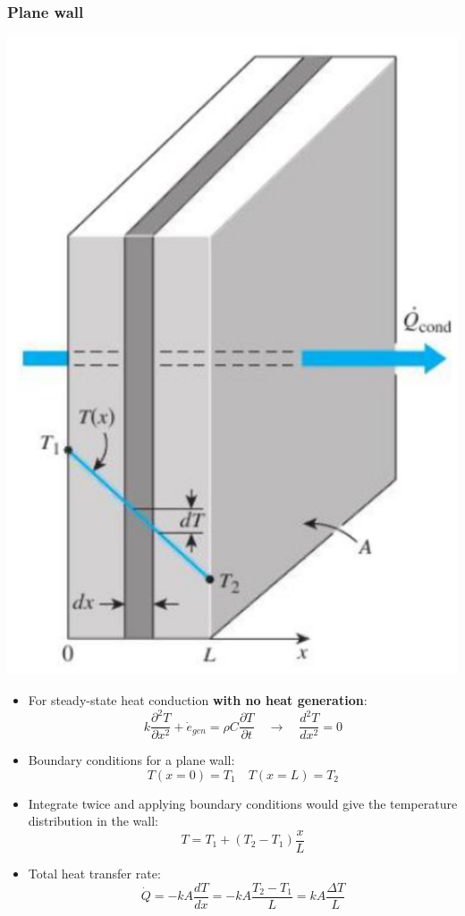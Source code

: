 \documentclass[11pt]{article}
\begin{document}
\subsubsection{Plane wall}
\label{sec:org6431ee4}
\begin{center}
\includegraphics[scale=0.7]{./images/steady-state-heat-conduction-plane-wall.png}
\end{center}
\begin{itemize}
\item For steady-state heat conduction \textbf{with no heat generation}:
\[k \frac{\partial^2 T}{\partial x^2} + \dot{e}_{gen} = \rho C \frac{\partial T}{\partial t} \quad \rightarrow \quad \frac{d^2 T}{dx^2} = 0\]
\item Boundary conditions for a plane wall:
\[T(x = 0) = T_1 \quad T(x = L) = T_2\]
\item Integrate twice and applying boundary conditions would give the temperature distribution in the wall:
\[T = T_1 + (T_2 - T_1) \frac{x}{L}\]
\item Total heat transfer rate:
\[\dot{Q} = -kA \frac{dT}{dx} = -kA \frac{T_2 - T_1}{L} = kA \frac{\Delta T}{L}\]
\end{itemize}
\end{document}

